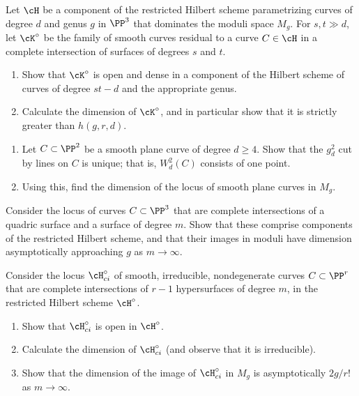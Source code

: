 \begin{exercise}\label{many large components}
Let $\cH$ be a component of the restricted Hilbert scheme param\-etrizing
curves of degree $d$ and genus $g$ in $\PP^3$ that dominates the moduli
space $M_g$. For $s, t \gg d$, let $\cK^\circ$ be the family of smooth
curves residual to a curve $C \in  \cH$ in a complete intersection of
surfaces of degrees $s$ and $t$.
\begin{enumerate}
\item Show that $\cK^\circ$ is open and dense in a component of the
Hilbert scheme of curves of degree $st-d$ and the appropriate genus.
\item Calculate the dimension of $\cK^\circ$, and in particular show
that it is strictly greater than $h(g,r,d)$.
\end{enumerate}
\end{exercise}

\begin{exercise}\label{moduli of plane curves}
\begin{enumerate}
\item Let $C \subset \PP^2$ be a smooth plane curve of degree $d\geq
4$. Show that the $g^2_d$ cut by lines on $C$ is unique; that is,
$W^2_d(C)$ consists of one point.
\item Using this, find the dimension of the locus of smooth plane curves
in $M_g$.
\end{enumerate}
\end{exercise}

\begin{exercise}\label{balanced ci}
Consider the locus of curves $C \subset \PP^3$ that are complete
intersections of a quadric surface and a surface of degree $m$. Show
that these comprise components of the restricted Hilbert scheme, and
that their images in moduli have dimension asymptotically approaching $g$
as $m \to \infty$.
\end{exercise}

\begin{exercise}\label{balanced CI in higher codim}
Consider the locus $\cH^\circ_{ci}$ of smooth, irreducible, nondegenerate
curves $C \subset \PP^r$ that are complete intersections of $r-1$
hypersurfaces of degree $m$, in the restricted Hilbert scheme $\cH^\circ$.
%
\begin{enumerate}
\item Show that $\cH^\circ_{ci}$ is open in $\cH^\circ$.
\item Calculate the dimension of $\cH^\circ_{ci}$ (and observe that it
is irreducible).
\item Show that the dimension of the image of $\cH^\circ_{ci}$ in $M_g$
is asymptotically $2g/r!$ as $m \to \infty$.
%
\end{enumerate}
\end{exercise}


